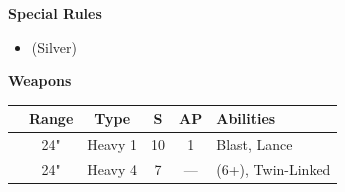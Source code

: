\begin{minipage}[t]{0.72\textwidth}
\begin{minipage}[t]{0.5\textwidth}
\begin{flushleft}
			\textbf{Special Rules}
			\begin{itemize}
				\item {} (Silver)
			\end{itemize}
		\end{flushleft}
	\end{minipage}
	
	
	\vspace*{2em}
	\textbf{Weapons}
	
	\begin{tabular}{m{95 pt} *{4}{c} >{\raggedright\arraybackslash}p{130pt}}
		& Range & Type & S & AP & Abilities \\
		\hline
		\quickref{Heavy Death Ray} & 24" & Heavy 1 & 10 & 1 & Blast, Lance \\
		\quickref{Tesla Destructor} & 24" & Heavy 4 & 7 & — & \quickref{Tesla} (6+), Twin-Linked \\
	\end{tabular}
\end{minipage}



\newpage
